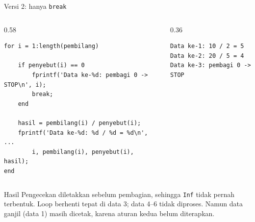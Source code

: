 \documentclass[aspectratio=169,10pt]{beamer}
\newcommand{\codesize}{\footnotesize}
\newcommand{\kode}[1]{\texttt{#1}}
\begin{document}
\begin{frame}[fragile]{Versi 2: hanya \kode{break}}
  \renewcommand{\codesize}{\scriptsize}
  \begin{columns}[T]
    \begin{column}{0.58\textwidth}
\begin{lstlisting}
for i = 1:length(pembilang)

    if penyebut(i) == 0
        fprintf('Data ke-%d: pembagi 0 -> STOP\n', i);
        break;
    end

    hasil = pembilang(i) / penyebut(i);
    fprintf('Data ke-%d: %d / %d = %d\n', ...
        i, pembilang(i), penyebut(i), hasil);
end
\end{lstlisting}
    \end{column}
    \begin{column}{0.36\textwidth}
\begin{lstlisting}[style=out]
Data ke-1: 10 / 2 = 5
Data ke-2: 20 / 5 = 4
Data ke-3: pembagi 0 -> STOP
\end{lstlisting}
    \end{column}
  \end{columns}
  \vspace{6pt}
  \begin{exampleblock}{Hasil}
    Pengecekan diletakkan \alert{sebelum} pembagian, sehingga \kode{Inf} tidak pernah terbentuk.
    Loop berhenti tepat di data 3; data 4--6 tidak diproses. Namun data ganjil (data 1) masih dicetak,
    karena aturan kedua belum diterapkan.
  \end{exampleblock}
\end{frame}
\end{document}
